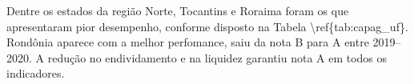 \documentclass[twocolumn, a4paper, 10pt]{report}
\begin{document}
    Dentre os estados da região Norte, Tocantins e Roraima foram os que
    apresentaram pior desempenho, conforme disposto na Tabela
    \textbackslash ref\{tab:capag\_uf\}. Rondônia aparece com a melhor
    perfomance, saiu da nota B para A entre 2019--2020. A redução no
    endividamento e na liquidez garantiu nota A em todos os indicadores.

    
\end{document}
